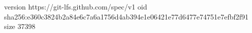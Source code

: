 version https://git-lfs.github.com/spec/v1
oid sha256:e360c3824b2a84e6c7a6a1756d4ab394e1e06421e77d6477e74751e7efbf2f91
size 37398
